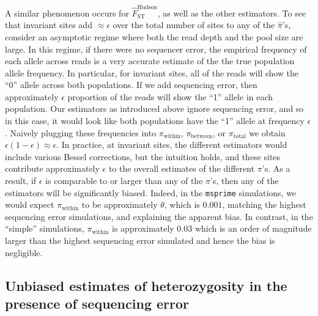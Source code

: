 \documentclass[letterpaper,fontsize=9pt,DIV=12]{scrartcl}
\newcounter{todo}
\newcommand\todo[1]{}
\newcommand\toolname{\textsc}
\newcommand{\hudsonestimator}{\widehat{F}_\text{ST}^\text{Hudson}}
\begin{document}
A similar phenomenon occurs for $\hudsonestimator$, as well as the other estimators.  To see that invariant sites add $\approx\epsilon$ over the total number of sites to any of the $\widehat{\pi}$'s, consider an asymptotic regime where both the read depth and the pool size are large.  In this regime, if there were no sequencer error, the empirical frequency of each allele across reads is a very accurate estimate of the the true population allele frequency.  In particular, for invariant sites, all of the reads will show the ``0'' allele across both populations.  If we add sequencing error, then approximately $\epsilon$ proportion of the reads will show the ``1'' allele in each population.  Our estimators as introduced above ignore sequencing error, and so in this case, it would look like both populations have the ``1'' allele at frequency $\epsilon$.  Naively plugging these frequencies into $\pi_\text{within}$, $\pi_\text{between}$, or $\pi_\text{total}$ we obtain $\epsilon(1-\epsilon)\approx \epsilon$.  In practice, at invariant sites, the different estimators would include various Bessel corrections, but the intuition holds, and these sites contribute approximately $\epsilon$ to the overall estimates of the different $\pi$'s.  As a result, if $\epsilon$ is comparable to or larger than any of the $\pi$'s, then any of the  estimators will be significantly biased.  Indeed, in the \texttt{msprime} simulations, we would expect $\pi_\text{within}$ to be approximately $\theta$, which is $0.001$, matching the highest sequencing error simulations, and explaining the apparent bias.  In contrast, in the ``simple'' simulations, $\pi_\text{within}$ is approximately $0.03$ which is an order of magnitude larger than the highest sequencing error simulated and hence the bias is negligible.



\subsection{Unbiased estimates of heterozygosity in the presence of sequencing error}
\label{supp:sec:FST:sub:HeterozygositySequencingError}
\end{document}
